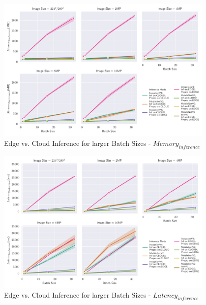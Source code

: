 \begin{figure}[H]
\centering
\includegraphics[width=0.95\textwidth]{./Bilder/single_plots/batch_size_plots/Effects_of_Batch_size_Inference_Memory.pdf}
\caption{Edge vs. Cloud Inference for larger Batch Sizes -  $Memory_{inference}$}
\label{fig:BatchSizeInferenceMemory}
\end{figure}
\begin{figure}[H]
\centering
\includegraphics[width=0.95\textwidth]{./Bilder/single_plots/batch_size_plots/Effects_of_Batch_size_Inference_Latencies.pdf}
\caption{Edge vs. Cloud Inference for larger Batch Sizes -  $Latency_{inference}$}
\label{fig:BatchSizeInferenceLatency}
\end{figure}
